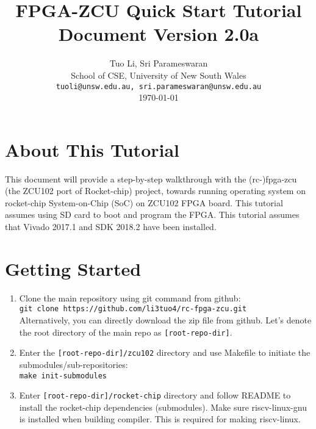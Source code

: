 \documentclass[a4paper,11pt]{article}
\begin{document}
\title{\vspace{-0.7in}\Large {\bf FPGA-ZCU Quick Start Tutorial} \\
Document Version 2.0a
  \vspace{-0.1in}}

\author{Tuo Li, Sri Parameswaran\\
  School of CSE, University of New South Wales \\
  {\tt tuoli@unsw.edu.au, sri.parameswaran@unsw.edu.au} \\
  \today
}
\date{} 

\newpage

\maketitle

\newpage

\section*{About This Tutorial}
This document will provide a step-by-step walkthrough with the (rc-)fpga-zcu (the ZCU102 port of Rocket-chip) project, towards running operating system on rocket-chip System-on-Chip (SoC) on ZCU102 FPGA board. 
This tutorial assumes using SD card to boot and program the FPGA.
This tutorial assumes that Vivado 2017.1 and SDK 2018.2 have been installed. 
\newpage

\section{Getting Started}

\newcommand{\rootdir}{[root-repo-dir]}

\begin{enumerate}
\item Clone the main repository using git command from github:\\
 {\tt git clone https://github.com/li3tuo4/rc-fpga-zcu.git}\\
 Alternatively, you can directly download the zip file from github.
 Let's denote the root directory of the main repo as \texttt{\rootdir}.
\item Enter the {\tt \rootdir/zcu102} directory and use Makefile to initiate the submodules/sub-repositories:\\
 {\tt make init-submodules}
 \item Enter {\tt \rootdir/rocket-chip} directory and follow README to install the rocket-chip dependencies (submodules). Make sure riscv-linux-gnu is installed when building compiler. This is required for making riscv-linux.
\end{enumerate}
\end{document}
